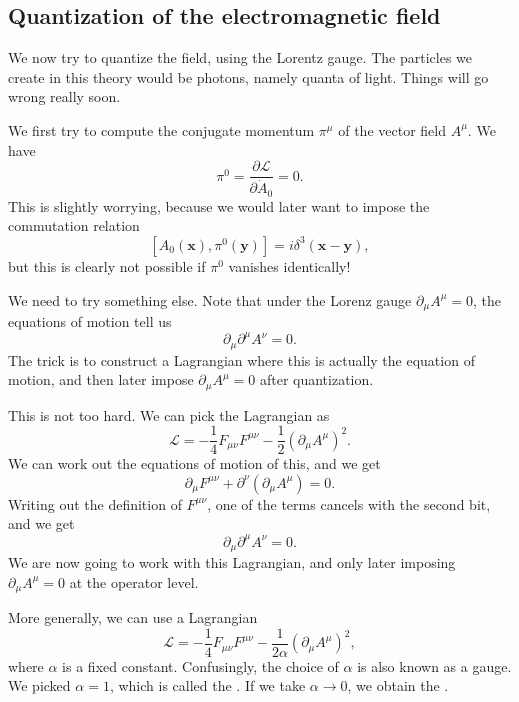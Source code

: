 \documentclass[a4paper]{article}
\begin{document}
\subsection{Quantization of the electromagnetic field}
We now try to quantize the field, using the Lorentz gauge. The particles we create in this theory would be photons, namely quanta of light. Things will go wrong really soon.

We first try to compute the conjugate momentum $\pi^\mu$ of the vector field $A^\mu$. We have
\[
  \pi^0 = \frac{\partial \mathcal{L}}{\partial \dot{A}_0} = 0.
\]
This is slightly worrying, because we would later want to impose the commutation relation
\[
  [A_0(\mathbf{x}), \pi^0(\mathbf{y})] = i \delta^3(\mathbf{x} - \mathbf{y}),
\]
but this is clearly not possible if $\pi^0$ vanishes identically!

We need to try something else. Note that under the Lorenz gauge $\partial_\mu A^\mu = 0$, the equations of motion tell us
\[
  \partial_\mu \partial^\mu A^\nu = 0.
\]
The trick is to construct a Lagrangian where this is actually the equation of motion, and then later impose $\partial_\mu A^\mu = 0$ after quantization.

This is not too hard. We can pick the Lagrangian as
\[
  \mathcal{L} = -\frac{1}{4} F_{\mu\nu}F^{\mu\nu} - \frac{1}{2}(\partial_\mu A^\mu)^2.
\]
We can work out the equations of motion of this, and we get
\[
  \partial_\mu F^{\mu\nu} + \partial^\nu(\partial_\mu A^\mu) = 0.
\]
Writing out the definition of $F^{\mu\nu}$, one of the terms cancels with the second bit, and we get
\[
  \partial_\mu \partial^\mu A^\nu = 0.
\]
We are now going to work with this Lagrangian, and only later imposing $\partial_\mu A^\mu = 0$ at the operator level.

More generally, we can use a Lagrangian
\[
  \mathcal{L} =- \frac{1}{4}F_{\mu\nu}F^{\mu\nu} - \frac{1}{2\alpha} (\partial_\mu A^\mu)^2,
\]
where $\alpha$ is a fixed constant. Confusingly, the choice of $\alpha$ is also known as a gauge. We picked $\alpha = 1$, which is called the . If we take $\alpha \to 0$, we obtain the .
\end{document}
